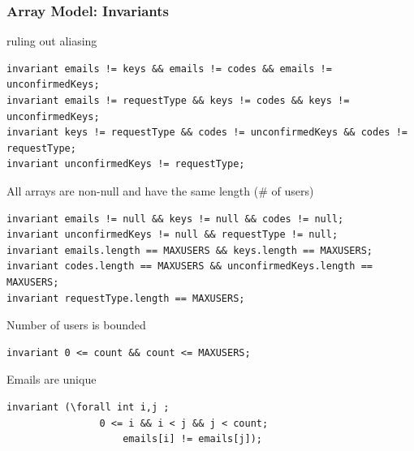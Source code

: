 \documentclass{beamer}
\begin{document}
\begin{frame}
\begin{columns}
\begin{column}{.45\textwidth}
      \end{column}
    \end{columns}
\end{frame}

\begin{frame}[fragile]
    \frametitle{Array Model: Invariants}
    
  \begin{block}{\small ruling out aliasing}
    \vspace{-.5em}
    \begin{lstlisting}
invariant emails != keys && emails != codes && emails != unconfirmedKeys;
invariant emails != requestType && keys != codes && keys != unconfirmedKeys;
invariant keys != requestType && codes != unconfirmedKeys && codes != requestType;
invariant unconfirmedKeys != requestType;\end{lstlisting}
  \end{block}
  \vspace{-1em}
  \begin{block}{\small All arrays are non-null and have the same length (\# of users)}
  \vspace{-.5em}
  \begin{lstlisting}
invariant emails != null && keys != null && codes != null;
invariant unconfirmedKeys != null && requestType != null;
invariant emails.length == MAXUSERS && keys.length == MAXUSERS;
invariant codes.length == MAXUSERS && unconfirmedKeys.length == MAXUSERS;
invariant requestType.length == MAXUSERS;\end{lstlisting}
  \end{block}
  \vspace{-1em}
  \begin{block}{\small Number of users is bounded}
  \vspace{-.5em}
\begin{lstlisting}
invariant 0 <= count && count <= MAXUSERS;\end{lstlisting}
  \end{block}
  \vspace{-1em}
\begin{block}{\small Emails are unique}
  \vspace{-.5em}
\begin{lstlisting}  
invariant (\forall int i,j ; 
                0 <= i && i < j && j < count; 
                    emails[i] != emails[j]);\end{lstlisting}
  \end{block}
\end{frame}
\end{document}
